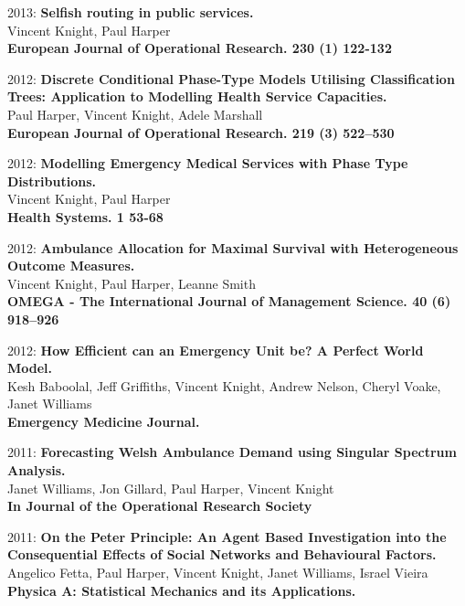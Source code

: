 \documentclass[10pt]{res} %
\begin{document}
\begin{resume}
\begin{etaremune}
\item
2013: \textbf{Selfish routing in public services.}\\
Vincent Knight, Paul Harper
\\
\textbf{European Journal of Operational Research. 230 (1) 122-132}
\\

\item
2012: \textbf{Discrete Conditional Phase-Type Models Utilising Classification Trees: Application to Modelling Health Service Capacities.}\\
Paul Harper, Vincent Knight, Adele Marshall
\\
\textbf{European Journal of Operational Research. 219 (3) 522--530}
\\

\item
2012: \textbf{Modelling Emergency Medical Services with Phase Type Distributions.}\\
Vincent Knight, Paul Harper
\\
\textbf{Health Systems. 1 53-68}
\\

\item
2012: \textbf{Ambulance Allocation for Maximal Survival with Heterogeneous Outcome Measures.}\\
Vincent Knight, Paul Harper, Leanne Smith
\\
\textbf{OMEGA - The International Journal of Management Science. 40 (6) 918--926}
\\

\item
2012: \textbf{How Efficient can an Emergency Unit be? A Perfect World Model.}\\
Kesh Baboolal, Jeff Griffiths, Vincent Knight, Andrew Nelson, Cheryl Voake, Janet Williams
\\
\textbf{Emergency Medicine Journal.}
\\

\item
2011: \textbf{Forecasting Welsh Ambulance Demand using Singular Spectrum Analysis.}\\
Janet Williams, Jon Gillard, Paul Harper, Vincent Knight
\\
\textbf{In Journal of the Operational Research Society}
\\

\item
2011: \textbf{On the Peter Principle: An Agent Based Investigation into the Consequential Effects of Social Networks and Behavioural Factors.}\\
Angelico Fetta, Paul Harper, Vincent Knight, Janet Williams, Israel Vieira
\\
\textbf{Physica A: Statistical Mechanics and its Applications.}
\\


\end{etaremune}
\end{resume}
\end{document}
